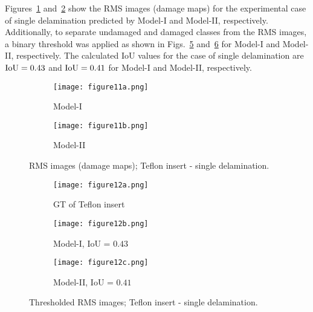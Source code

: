 \begin{sloppypar}
	Figures~\ref{fig:RMS_CFRP_Teflon_3o_saeed} and~\ref{fig:RMS_CFRP_Teflon_3o_ijjeh} show the RMS images (damage maps) for the experimental case of single delamination predicted by Model-I and Model-II, respectively.
	Additionally, to separate undamaged and damaged classes from the RMS images, a binary threshold was applied as shown in Figs.~\ref{fig:RMS_threshold_CFRP_Teflon_3o_saeed} and~\ref{fig:RMS_threshold_CFRP_Teflon_3o_ijjeh} for Model-I and Model-II, respectively. 
	The calculated IoU values for the case of single delamination are \(\textup{IoU}=0.43\) and \(\textup{IoU}=0.41\) for Model-I and Model-II, respectively.
	
	\begin{figure} [!ht]
		\begin{subfigure}[b]{.48\textwidth}
			\centering
			\texttt{[image: figure11a.png]}
			\caption{Model-I}
			\label{fig:RMS_CFRP_Teflon_3o_saeed}
		\end{subfigure}
		\hfill
		\begin{subfigure}[b]{.48\textwidth}
			\centering
			\texttt{[image: figure11b.png]}
			\caption{Model-II} 
			\label{fig:RMS_CFRP_Teflon_3o_ijjeh}
		\end{subfigure}
		\caption{RMS images (damage maps); Teflon insert - single delamination.}
		\label{fig:RMS_CFRP_Teflon_3o_images}
	\end{figure} 

	\begin{figure} [!ht]
		\begin{subfigure}[b]{0.32\textwidth}
			\centering
			\texttt{[image: figure12a.png]}
			\caption{GT of Teflon insert}
			\label{fig:exp_CFRP_teflon_3o_GT}
		\end{subfigure}
		\hfill
		\begin{subfigure}[b]{.32\textwidth}
			\centering
			\texttt{[image: figure12b.png]}
			\caption{Model-I, IoU = \(0.43\)}
			\label{fig:RMS_threshold_CFRP_Teflon_3o_saeed}
		\end{subfigure}
		\hfill
		\begin{subfigure}[b]{.32\textwidth}
			\centering
			\texttt{[image: figure12c.png]}
			\caption{Model-II, IoU = \(0.41\)} 
			\label{fig:RMS_threshold_CFRP_Teflon_3o_ijjeh}
		\end{subfigure}
		\caption{Thresholded RMS images; Teflon insert - single delamination.}
		\label{fig:RMS_threshold_CFRP_Teflon_3o_images}
	\end{figure} 
	

\end{sloppypar}
